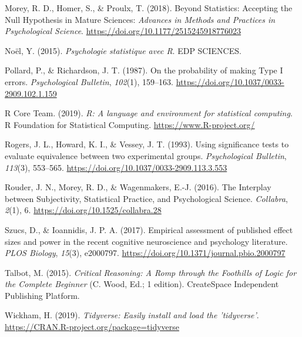 \documentclass[
  a4paper,11pt,twoside,onecolumn,openright,final,oldfontcommands]{memoir}
\newlength{\cslhangindent}
\newlength{\cslentryspacingunit} %
\newenvironment{CSLReferences}[2] %
 {%
  \setlength{\parindent}{0pt}
  \ifodd #1
  \let\oldpar\par
  \def\par{\hangindent=\cslhangindent\oldpar}
  \fi
  \setlength{\parskip}{#2\cslentryspacingunit}
 }%
 {}
\theoremstyle{definition}
\theoremstyle{definition}
\theoremstyle{definition}
\theoremstyle{definition}
\theoremstyle{remark}
\begin{document}
\begin{CSLReferences}{1}{0}
\leavevmode{}%
Morey, R. D., Homer, S., \& Proulx, T. (2018). Beyond {Statistics}: {Accepting} the {Null} {Hypothesis} in {Mature} {Sciences}: \emph{Advances in Methods and Practices in Psychological Science}. \url{https://doi.org/10.1177/2515245918776023}

\leavevmode{}%
Noël, Y. (2015). \emph{Psychologie statistique avec {R}}. EDP SCIENCES.

\leavevmode{}%
Pollard, P., \& Richardson, J. T. (1987). On the probability of making {Type} {I} errors. \emph{Psychological Bulletin}, \emph{102}(1), 159--163. \url{https://doi.org/10.1037/0033-2909.102.1.159}

\leavevmode{}%
R Core Team. (2019). \emph{R: A language and environment for statistical computing}. R Foundation for Statistical Computing. \url{https://www.R-project.org/}

\leavevmode{}%
Rogers, J. L., Howard, K. I., \& Vessey, J. T. (1993). Using significance tests to evaluate equivalence between two experimental groups. \emph{Psychological Bulletin}, \emph{113}(3), 553--565. \url{https://doi.org/10.1037/0033-2909.113.3.553}

\leavevmode{}%
Rouder, J. N., Morey, R. D., \& Wagenmakers, E.-J. (2016). The {Interplay} between {Subjectivity}, {Statistical} {Practice}, and {Psychological} {Science}. \emph{Collabra}, \emph{2}(1), 6. \url{https://doi.org/10.1525/collabra.28}

\leavevmode{}%
Szucs, D., \& Ioannidis, J. P. A. (2017). Empirical assessment of published effect sizes and power in the recent cognitive neuroscience and psychology literature. \emph{PLOS Biology}, \emph{15}(3), e2000797. \url{https://doi.org/10.1371/journal.pbio.2000797}

\leavevmode{}%
Talbot, M. (2015). \emph{Critical {Reasoning}: {A} {Romp} through the {Foothills} of {Logic} for the {Complete} {Beginner}} (C. Wood, Ed.; 1 edition). CreateSpace Independent Publishing Platform.

\leavevmode{}%
Wickham, H. (2019). \emph{Tidyverse: Easily install and load the 'tidyverse'}. \url{https://CRAN.R-project.org/package=tidyverse}


\end{CSLReferences}
\end{document}
